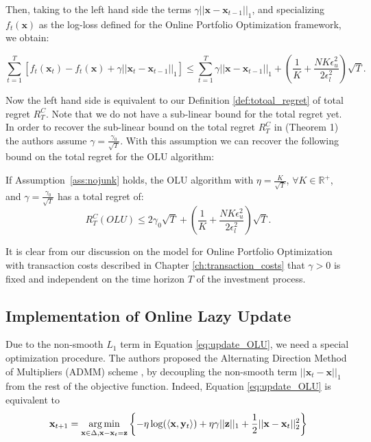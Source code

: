 Then, taking to the left hand side the terms $\gamma||\mathbf x-\mathbf x_{t-1}||_1$, and specializing $f_t(\mathbf x)$ as the log-loss defined for the Online Portfolio Optimization framework, we obtain:

\begin{equation}
\sum\limits_{t=1}^T[f_t(\mathbf x_t)-f_t(\mathbf x)+\gamma||\mathbf x_t-\mathbf x_{t-1}||_1]\le \sum\limits_{t=1}^T\gamma||\mathbf x-\mathbf x_{t-1}||_1+\left( \frac{1}{K} + \frac{N K \epsilon_u^2 }{2 \epsilon_l^2} \right) \sqrt{T}.
\end{equation}

Now the left hand side is equivalent to our Definition \ref{def:totoal_regret} of total regret $R_T^C$. Note that we do not have a sub-linear bound for the total regret yet. In order to recover the sub-linear bound on the total regret $R_T^C$ in \cite{das2014online} (Theorem 1) the authors assume $\gamma=\frac{\gamma_0}{\sqrt{T}}$. With this assumption we can recover the following bound on the total regret for the OLU algorithm:

\begin{theorem}\label{th:OLU}
    If Assumption~\ref{ass:nojunk} holds, the OLU algorithm with $\eta = \frac{K}{\sqrt{T}}$, $\forall K \in \mathbb{R}^+$, and $\gamma=\frac{\gamma_0}{\sqrt T}$ has a total regret of:
    \begin{equation}\label{eq:OLU_regret}
R_T^C(OLU)\le2\gamma_0\sqrt{T}+\left( \frac{1}{K} + \frac{N K \epsilon_u^2 }{2 \epsilon_l^2} \right) \sqrt{T}.
\end{equation}

\end{theorem}

It is clear from our discussion on the model for Online Portfolio Optimization with transaction costs described in Chapter \ref{ch:transaction_costs} that $\gamma>0$ is fixed and independent on the time horizon $T$ of the investment process. 

\subsection{Implementation of Online Lazy Update}

Due to the non-smooth $L_1$ term in Equation \eqref{eq:update_OLU}, we need a special optimization procedure. The authors proposed the Alternating Direction Method of Multipliers (ADMM) scheme \cite{boyd2011distributed}, by decoupling the non-smooth term $||\mathbf x_t-\mathbf x||_1$ from the rest of the objective function.
Indeed, Equation \eqref{eq:update_OLU} is equivalent to 
\begin{equation}
\mathbf x_{t+1}=\operatorname*{arg\,min}\limits_{\mathbf x\in\Delta,\mathbf x-\mathbf x_t=\mathbf z}\left\{-\eta\log(\langle\mathbf x,\mathbf y_t\rangle)+\eta\gamma||\mathbf z||_1+\frac{1}{2}||\mathbf x-\mathbf x_t||_2^2\right\}
\end{equation}

